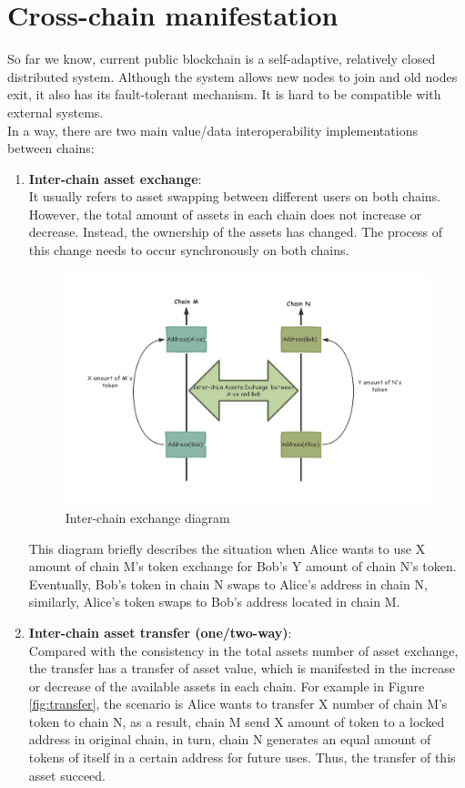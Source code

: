 \section{Cross-chain manifestation}
\noindent So far we know, current public blockchain is a self-adaptive, relatively closed distributed system. Although the system allows new nodes to join and old nodes exit, it also has its fault-tolerant mechanism. It is hard to be compatible with external systems. \\
\noindent In a way, there are two main value/data interoperability implementations between chains:
\begin{enumerate}
    \item \textbf{Inter-chain asset exchange}: \\
    It usually refers to asset swapping between different users on both chains. However, the total amount of assets in each chain does not increase or decrease. Instead, the ownership of the assets has changed. The process of this change needs to occur synchronously on both chains. \\
    \begin{figure}[H]
    \includegraphics[width=1\textwidth]{./figures/asset_swap.png}
    \centering
    \caption{Inter-chain exchange diagram}%
    \centering
    \label{fig:swap}
    \end{figure}
    
    This diagram briefly describes the situation when Alice wants to use X amount of chain M's token exchange for Bob's Y amount of chain N's token. Eventually, Bob's token in chain N swaps to Alice's address in chain N, similarly, Alice's token swaps to Bob's address located in chain M.
    \item \textbf{Inter-chain asset transfer (one/two-way)}: \\
    Compared with the consistency in the total assets number of asset exchange, the transfer has a transfer of asset value, which is manifested in the increase or decrease of the available assets in each chain. For example in Figure \ref{fig:transfer}, the scenario is Alice wants to transfer X number of chain M's token to chain N, as a result, chain M send X amount of token to a locked address in original chain, in turn, chain N generates an equal amount of tokens of itself in a certain address for future uses. Thus, the transfer of this asset succeed.


\end{enumerate}
